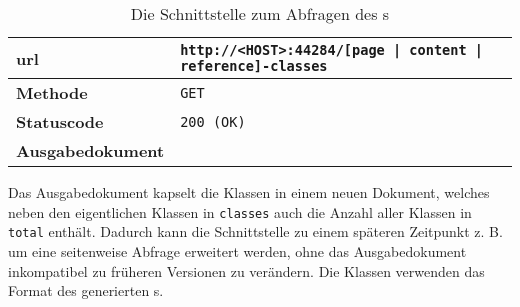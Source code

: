     \begin{table}[htb]
        \centering
        \begin{tabular}{|l|l|}
        \hline
        \textbf{\gls{url}} & \texttt{http://<HOST>:44284/[page | content | reference]-classes}\\
        \hline
        \textbf{Methode} & \texttt{GET}\\
        \hline
        \textbf{Statuscode} & \texttt{200 (OK)}\\
        \hline
        \textbf{Ausgabedokument} & \\
        \hline
        \end{tabular}
        \caption{Die Schnittstelle zum Abfragen des {\classificationModel}s}
        \label{table:getClassesInterface}
    \end{table}

    Das Ausgabedokument kapselt die Klassen in einem neuen Dokument,
    welches neben den eigentlichen Klassen in \texttt{classes}
    auch die Anzahl aller Klassen in \texttt{total} enthält.
    Dadurch kann die Schnittstelle zu einem späteren Zeitpunkt z. B. um eine
    seitenweise Abfrage erweitert werden,
    ohne das Ausgabedokument inkompatibel zu früheren Versionen zu verändern.
    Die Klassen verwenden das Format des generierten
    {\classificationModel}s.
